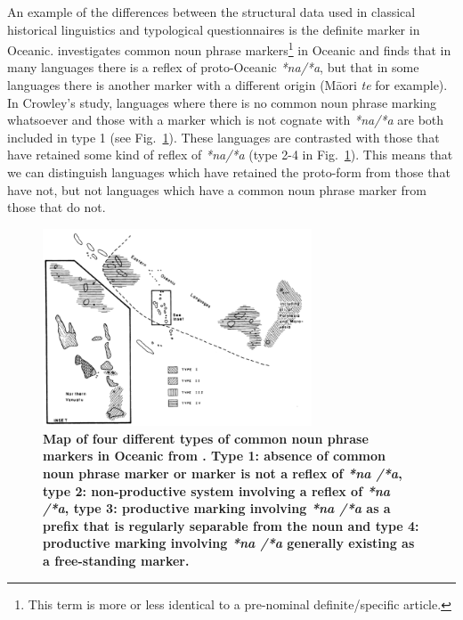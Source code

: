 \documentclass[a4paper,10pt]{article} %
\begin{document}
An example of the differences between the structural data used in classical historical linguistics and typological questionnaires is the definite marker in Oceanic. \citet{crowley1985common} investigates common noun phrase markers\footnote{This term is more or less identical to a pre-nominal definite/specific article.} in Oceanic and finds that in many languages there is a reflex of proto-Oceanic \emph{*na/*a}, but that in some languages there is another marker with a different origin (M\={a}ori \emph{te} for example). In Crowley's study, languages where there is no common noun phrase marking whatsoever and those with a marker which is not cognate with \emph{*na/*a} are both included in type 1 (see Fig.~\ref{fig:crowley_map}). These languages are contrasted with those that have retained some kind of reflex of \emph{*na/*a} (type 2-4 in Fig.~\ref{fig:crowley_map}). This means that we can distinguish languages which have retained the proto-form from those that have not, but not languages which have a common noun phrase marker from those that do not.

\begin{figure}
\centering
\includegraphics[width=8cm]{illustrations/crowley_1985_map.png}
\caption[Map of four different types of common noun phrase markers in Oceanic from Crowley(1985).]{\textbf{Map of four different types of common noun phrase markers in Oceanic from \citet[162]{crowley1985common}. Type 1: absence of common noun phrase marker or marker is not a reflex of \emph{*na /*a}, type 2: non-productive system involving a reflex of \emph{*na /*a}, type 3: productive marking involving \emph{*na /*a} as a prefix that is regularly separable from the noun and type 4: productive marking involving \emph{*na /*a} generally existing as a free-standing marker.}}
\label{fig:crowley_map}
\end{figure}
\end{document}
